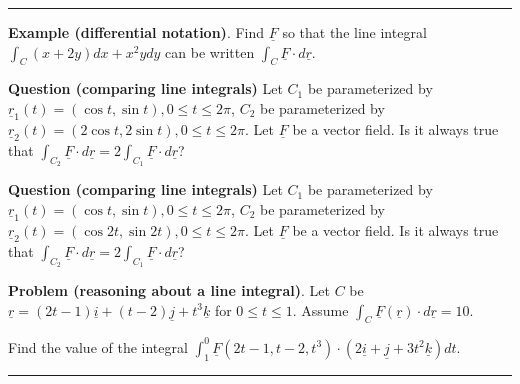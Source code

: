 \documentclass[12pt,letterpaper,noanswers]{exam}
\newcommand{\mb}[1]{\underline{#1}}
\begin{document}
 


\vspace{0.2cm}
\hrule
\vspace{0.2cm}
 
\noindent\textbf{Example (differential notation)}.  Find $\mb F$ so that the line integral $\int_C (x+2y)dx + x^2ydy$ can be written $\int_C \mb F\cdot d\mb r$.

 \vspace{1in}
 
 
 
  

 
 \noindent\textbf{Question (comparing line integrals)} Let $C_1$ be parameterized by $\mb r_1(t) = (\cos t,\sin t), 0\leq t\leq 2\pi$, $C_2$ be parameterized by $\mb r_2(t) = (2\cos t,2\sin t), 0\leq t\leq 2\pi$.  Let $\mb F$ be a vector field.  Is it always true that $\displaystyle\int_{C_2} \mb F\cdot d\mb r = 2\int_{C_1}\mb F\cdot d\mb r$? 
 

\vspace{1in}

\noindent\textbf{Question (comparing line integrals)} Let $C_1$ be parameterized by $\mb r_1(t) = (\cos t,\sin t), 0\leq t\leq 2\pi$, $C_2$ be parameterized by $\mb r_2(t) = (\cos 2t,\sin 2t), 0\leq t\leq 2\pi$.  Let $\mb F$ be a vector field.  Is it always true that $\displaystyle\int_{C_2} \mb F\cdot d\mb r = 2\int_{C_1}\mb F\cdot d\mb r$? 

\vspace{1in}

\noindent\textbf{Problem (reasoning about a line integral)}.  Let $C$ be $\mb r = (2t-1)\mb i + (t-2)\mb j + t^3\mb k$ for $0\leq t\leq 1$.  Assume $\int_C \mb F(\mb r)\cdot d\mb r = 10$.
 
 Find the value of the integral $\displaystyle\int_1^0 \mb F\left(2t-1, t-2, t^3\right)\cdot (2\mb i + \mb j +3t^2\mb k)dt$. 
 
 
 \vspace{1.5in}
 
 




\vspace{0.2cm}
\hrule
\vspace{0.2cm}
\end{document}
